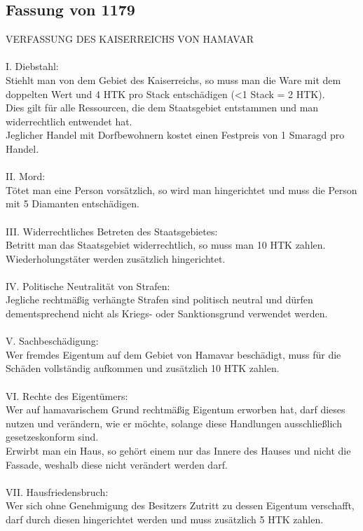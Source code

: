 \documentclass{article}
\begin{document}
\subsection{Fassung von 1179}
VERFASSUNG DES KAISERREICHS VON HAMAVAR
\\\\
I. Diebstahl:\\Stiehlt man von dem Gebiet des Kaiserreichs, so muss man die Ware mit dem doppelten Wert und 4 HTK pro Stack entschädigen (<1 Stack = 2 HTK).\\Dies gilt für alle Ressourcen, die dem Staatsgebiet entstammen und man widerrechtlich entwendet hat.\\Jeglicher Handel mit Dorfbewohnern kostet einen Festpreis von 1 Smaragd pro Handel.
\\\\
II. Mord:\\Tötet man eine Person vorsätzlich, so wird man hingerichtet und muss die Person mit 5 Diamanten entschädigen.
\\\\
III. Widerrechtliches Betreten des Staatsgebietes:\\Betritt man das Staatsgebiet widerrechtlich, so muss man 10 HTK zahlen.\\Wiederholungstäter werden zusätzlich hingerichtet.
\\\\
IV. Politische Neutralität von Strafen:\\Jegliche rechtmäßig verhängte Strafen sind politisch neutral und dürfen dementsprechend nicht als Kriegs- oder Sanktionsgrund verwendet werden.
\\\\
V. Sachbeschädigung:\\Wer fremdes Eigentum auf dem Gebiet von Hamavar beschädigt, muss für die Schäden vollständig aufkommen und zusätzlich 10 HTK zahlen.
\\\\
VI. Rechte des Eigentümers:\\Wer auf hamavarischem Grund rechtmäßig Eigentum erworben hat, darf dieses nutzen und verändern, wie er möchte, solange diese Handlungen ausschließlich gesetzeskonform sind.\\Erwirbt man ein Haus, so gehört einem nur das Innere des Hauses und nicht die Fassade, weshalb diese nicht verändert werden darf.
\\\\
VII. Hausfriedensbruch:\\Wer sich ohne Genehmigung des Besitzers Zutritt zu dessen Eigentum verschafft, darf durch diesen hingerichtet werden und muss zusätzlich 5 HTK zahlen.
\end{document}
